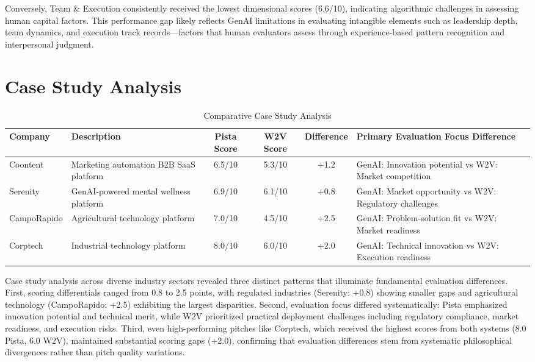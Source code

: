 Conversely, Team \& Execution consistently received the lowest dimensional scores (6.6/10), indicating algorithmic challenges in assessing human capital factors. This performance gap likely reflects GenAI limitations in evaluating intangible elements such as leadership depth, team dynamics, and execution track records—factors that human evaluators assess through experience-based pattern recognition and interpersonal judgment.

\section{Case Study Analysis}

\begin{table}[ht]
    \centering
    \caption{Comparative Case Study Analysis}
    \label{tab:case-studies}
    \begin{tabular}{lp{3cm}cccp{4cm}}
        \toprule
        \textbf{Company} & \textbf{Description} & \textbf{Pista Score} & \textbf{W2V Score} & \textbf{Difference} & \textbf{Primary Evaluation Focus Difference} \\
        \midrule
        Coontent & Marketing automation B2B SaaS platform & 6.5/10 & 5.3/10 & +1.2 & GenAI: Innovation potential vs W2V: Market competition \\
        \midrule
        Serenity & GenAI-powered mental wellness platform & 6.9/10 & 6.1/10 & +0.8 & GenAI: Market opportunity vs W2V: Regulatory challenges \\
        \midrule
        CampoRapido & Agricultural technology platform & 7.0/10 & 4.5/10 & +2.5 & GenAI: Problem-solution fit vs W2V: Market readiness \\
        \midrule
        Corptech & Industrial technology platform & 8.0/10 & 6.0/10 & +2.0 & GenAI: Technical innovation vs W2V: Execution readiness \\
        \bottomrule
    \end{tabular}
\end{table}

Case study analysis across diverse industry sectors revealed three distinct patterns that illuminate fundamental evaluation differences. First, scoring differentials ranged from 0.8 to 2.5 points, with regulated industries (Serenity: +0.8) showing smaller gaps and agricultural technology (CampoRapido: +2.5) exhibiting the largest disparities. Second, evaluation focus differed systematically: Pista emphasized innovation potential and technical merit, while W2V prioritized practical deployment challenges including regulatory compliance, market readiness, and execution risks. Third, even high-performing pitches like Corptech, which received the highest scores from both systems (8.0 Pista, 6.0 W2V), maintained substantial scoring gaps (+2.0), confirming that evaluation differences stem from systematic philosophical divergences rather than pitch quality variations.

